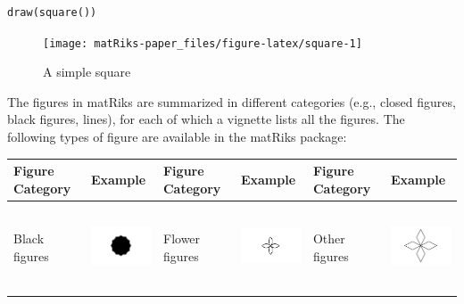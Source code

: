 \begin{verbatim}
draw(square())
\end{verbatim}

\begin{figure}

{\centering \texttt{[image: matRiks-paper\_files/figure-latex/square-1]} 

}

\caption{A simple square}\label{fig:square}
\end{figure}

The figures in matRiks are summarized in different categories (e.g., closed figures, black figures, lines), for each of which a vignette lists all the figures. The following types of figure are available in the matRiks package:

\begin{table}
\centering
\begin{tabular}[t]{l>{}ll>{}ll>{}l}
\toprule
Figure Category & Example & Figure Category & Example & Figure Category & Example\\
\midrule
Black figures & \includegraphics[width=1in, height=1in]{black-figures.png} & Flower figures & \includegraphics[width=1in, height=1in]{flowers.png} & Other figures & \includegraphics[width=1in, height=1in]{other-figures.png}\\

\end{tabular}
\end{table}
